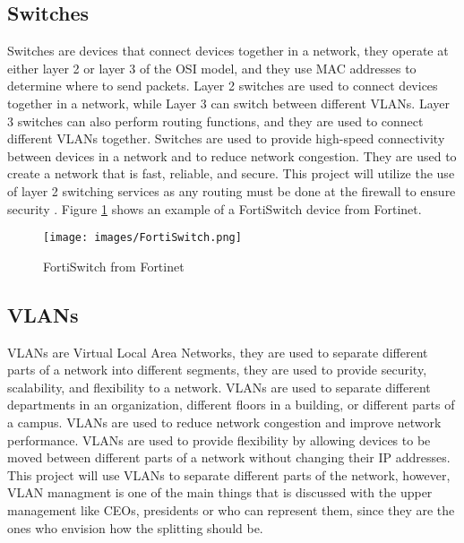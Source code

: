 \documentclass[12pt]{report}
\begin{document}
\subsection{Switches}
Switches are devices that connect devices together in a network, they operate at either layer 2 or layer 3 of the OSI model, and they use MAC addresses to determine where to send packets. Layer 2 switches are used to connect devices together in a network, while Layer 3 can switch between different VLANs. Layer 3 switches can also perform routing functions, and they are used to connect different VLANs together. Switches are used to provide high-speed connectivity between devices in a network and to reduce network congestion. They are used to create a network that is fast, reliable, and secure. This project will utilize the use of layer 2 switching services as any routing must be done at the firewall to ensure security \cite{switch}. Figure \ref{fig:FortiSwitch} shows an example of a FortiSwitch device from Fortinet.
\begin{figure}[h]
    \centering
    \texttt{[image: images/FortiSwitch.png]}
    \caption{FortiSwitch from Fortinet \cite{FSIMG}}
    \label{fig:FortiSwitch}
\end{figure} 


\subsection{VLANs}
VLANs are Virtual Local Area Networks, they are used to separate different parts of a network into different segments, they are used to provide security, scalability, and flexibility to a network. VLANs are used to separate different departments in an organization, different floors in a building, or different parts of a campus. VLANs are used to reduce network congestion and improve network performance. VLANs are used to provide flexibility by allowing devices to be moved between different parts of a network without changing their IP addresses. This project will use VLANs to separate different parts of the network, however, VLAN managment is one of the main things that is discussed with the upper management like CEOs, presidents or who can represent them, since they are the ones who envision how the splitting should be. \cite{VLAN}
\end{document}
